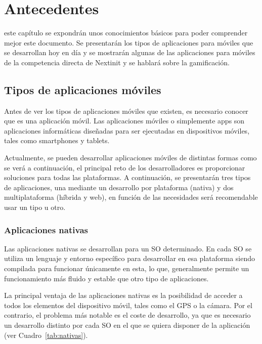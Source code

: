 \chapter{Antecedentes}
\label{chap:antecedentes}

 este capítulo se expondrán unos conocimientos básicos para poder comprender mejor este documento. Se presentarán 
los tipos de aplicaciones para móviles que se desarrollan hoy en día y se mostrarán algunas de las aplicaciones para móviles
de la competencia directa de Nextinit y se hablará sobre la gamificación.

\section{Tipos de aplicaciones móviles}

Antes de ver los tipos de aplicaciones móviles que existen, es necesario conocer que es una aplicación móvil. Las aplicaciones
móviles o simplemente apps son aplicaciones informáticas diseñadas para ser ejecutadas en dispositivos móviles, tales 
como smartphones y tablets.

Actualmente, se pueden desarrollar aplicaciones móviles de distintas formas \cite{ANADES} como se verá a continuación, el 
principal reto de los desarrolladores es proporcionar soluciones para todas las plataformas.  A continuación, se presentarán 
tres tipos de aplicaciones, una mediante un desarrollo por plataforma (nativa) y dos multiplataforma (híbrida y web), en 
función de las necesidades será recomendable usar un tipo u otro.

\subsection{Aplicaciones nativas}

Las aplicaciones nativas se desarrollan para un \acf{SO} determinado. En cada \acs{SO} se utiliza un lenguaje y entorno 
específico para desarrollar en esa plataforma siendo compilada para funcionar únicamente en esta, lo que, generalmente 
permite un funcionamiento más fluido y estable que otro tipo de aplicaciones.

La principal ventaja de las aplicaciones nativas es la posibilidad de acceder a todos los elementos del dispositivo móvil, tales
como el \acs{GPS} o la cámara. Por el contrario, el problema más notable es el coste de desarrollo, ya que es necesario
un desarrollo distinto por cada \acs{SO} en el que se quiera disponer de la aplicación (ver Cuadro~\ref{tab:nativas}).

